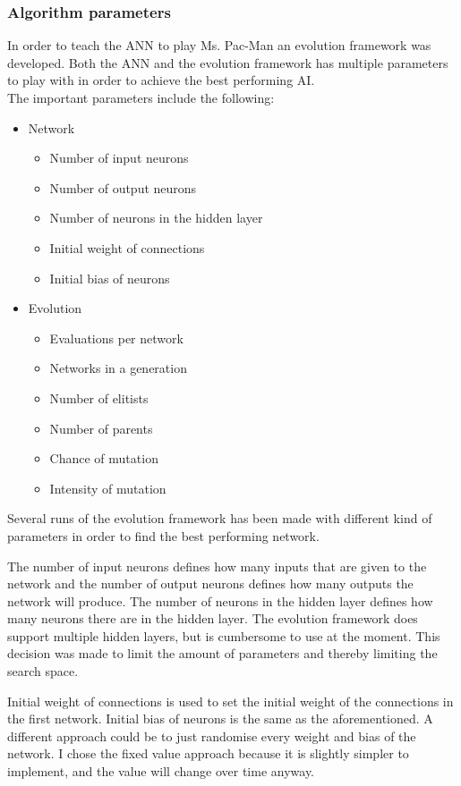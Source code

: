 \subsubsection{Algorithm parameters}
In order to teach the ANN to play Ms. Pac-Man an evolution framework was developed. Both the ANN and the evolution framework has multiple parameters to play with in order to achieve the best performing AI. \\

\noindent The important parameters include the following:

\begin{itemize}
	\item Network
	\begin{itemize}
		\item Number of input neurons
		\item Number of output neurons
		\item Number of neurons in the hidden layer
		\item Initial weight of connections
		\item Initial bias of neurons
	\end{itemize}
	
	\item Evolution
	\begin{itemize}
		\item Evaluations per network
		\item Networks in a generation
		\item Number of elitists
		\item Number of parents
		\item Chance of mutation
		\item Intensity of mutation
	\end{itemize}
\end{itemize}

\noindent Several runs of the evolution framework has been made with different kind of parameters in order to find the best performing network.

The number of input neurons defines how many inputs that are given to the network and the number of output neurons defines how many outputs the network will produce. The number of neurons in the hidden layer defines how many neurons there are in the hidden layer. The evolution framework does support multiple hidden layers, but is cumbersome to use at the moment. This decision was made to limit the amount of parameters and thereby limiting the search space.

Initial weight of connections is used to set the initial weight of the connections in the first network. Initial bias of neurons is the same as the aforementioned. A different approach could be to just randomise every weight and bias of the network. I chose the fixed value approach because it is slightly simpler to implement, and the value will change over time anyway.

